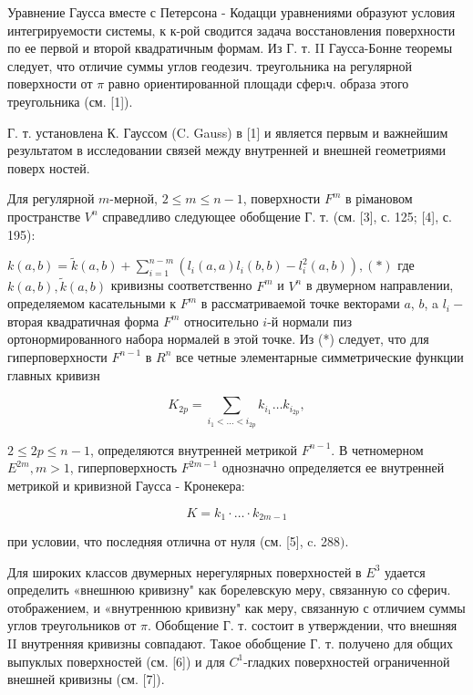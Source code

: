 \documentclass[10pt]{article}
\begin{document}
Уравнение Гаусса вместе с Петерсона - Кодацци уравнениями образуют условия интегрируемости системы, к к-рой сводится задача восстановления поверхности по ее первой и второй квадратичным формам. Из Г. т. II Гаусса-Бонне теоремы следует, что отличие суммы углов геодезич. треугольника на регулярной поверхности от $\pi$ равно ориентированной площади сферıч. образа этого треугольника (см. [1]).



Г. т. установлена К. Гауссом (C. Gauss) в [1] и является первым и важнейшим результатом в исследовании связей между внутренней и внешней геометриями поверх ностей.



Для регулярной $m$-мерной, $2 \leqslant m \leqslant n-1$, поверхности $F^{m}$ в рімановом пространстве $V^{n}$ справедливо следующее обобщение Г. т. (см. [3], с. 125; [4], с. 195):



$k(a, b)=\tilde{k}(a, b)+\sum_{i=1}^{n-m}\left(l_{i}(a, a) l_{i}(b, b)-l_{i}^{2}(a, b)\right),(*)$ где $k(a, b), \tilde{k}(a, b)$ кривизны соответственно $F^{m}$ и $V^{n}$ в двумерном направлении, определяемом касательными к $F^{m}$ в рассматриваемой точке векторами $a$, $b$, a $l_{i}-$ вторая квадратичная форма $F^{m}$ относительно $i$-й нормали пиз ортонормированного набора нормалей в этой точке. Из (*) следует, что для гиперповерхности $F^{n-1}$ в $R^{n}$ все четные элементарные симметрические функции главных кривизн



\[

K_{2 p}=\sum_{i_{1}<\ldots<i_{2 p}} k_{i_{1}} \ldots k_{i_{2 p}},

\]



$2 \leqslant 2 p \leqslant n-1$, определяются внутренней метрикой $F^{n-1}$. В четномерном $E^{2 m}, m>1$, гиперповерхность $F^{2 m-1}$ однозначно определяется ее внутренней метрикой и кривизной Гаусса - Кронекера:



\[

K=k_{1} \cdot \ldots \cdot k_{2 m-1}

\]



при условии, что последняя отлична от нуля (см. [5], c. 288$)$.



Для широких классов двумерных нерегулярных поверхностей в $E^{3}$ удается определить «внешнюю кривизну" как борелевскую меру, связанную со сферич. отображением, и «внутреннюю кривизну" как меру, связанную с отличием суммы углов треугольников от $\pi$. Обобщение Г. т. состоит в утверждении, что внешняя II внутренняя кривизны совпадают. Такое обобщение Г. т. получено для общих выпуклых поверхностей (см. [6]) и для $C^{1}$-гладких поверхностей ограниченной внешней кривизны (см. [7]).
\end{document}
